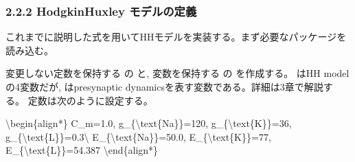 \documentclass[letterpaper,10pt,english]{sphinxmanual}
\begin{document}
\subsubsection{2.2.2 Hodgkin\sphinxhyphen{}Huxley モデルの定義}
\label{\detokenize{2-2_hodgkinhuxley:id2}}
これまでに説明した式を用いてHHモデルを実装する。まず必要なパッケージを読み込む。

\begin{sphinxVerbatim}[commandchars=\\\{\}]
  
   
\end{sphinxVerbatim}

変更しない定数を保持する  の  と, 変数を保持する  の  を作成する。 はHH modelの4変数だが,  はpre\sphinxhyphen{}synaptic dynamicsを表す変数である。詳細は3章で解説する。 定数は次のように設定する。

\textbackslash{}begin\{align*\}
C\_m=1.0, g\_\{\textbackslash{}text\{Na\}\}=120, g\_\{\textbackslash{}text\{K\}\}=36, g\_\{\textbackslash{}text\{L\}\}=0.3\textbackslash{}
E\_\{\textbackslash{}text\{Na\}\}=50.0, E\_\{\textbackslash{}text\{K\}\}=\sphinxhyphen{}77, E\_\{\textbackslash{}text\{L\}\}=\sphinxhyphen{}54.387
\textbackslash{}end\{align*\}
\end{document}

